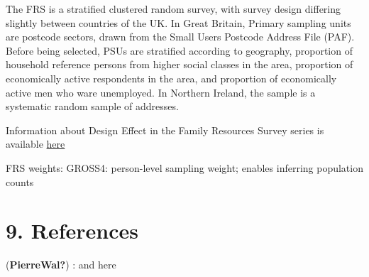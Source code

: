 \documentclass[
  14,
  a4paper,
  DIV=11,
  numbers=noendperiod]{scrartcl}
\begin{document}
The FRS is a stratified clustered random survey, with survey design
differing slightly between countries of the UK. In Great Britain,
Primary sampling units are postcode sectors, drawn from the Small Users
Postcode Address File (PAF). Before being selected, PSUs are stratified
according to geography, proportion of household reference persons from
higher social classes in the area, proportion of economically active
respondents in the area, and proportion of economically active men who
ware unemployed. In Northern Ireland, the sample is a systematic random
sample of addresses.

Information about Design Effect in the Family Resources Survey series is
available
\href{https://assets.publishing.service.gov.uk/government/uploads/system/uploads/attachment_data/file/972808/Ch1_Methodology_and_Standard_Errors.xlsx}{here}

FRS weights: GROSS4: person-level sampling weight; enables inferring
population counts

\hypertarget{references}{%
\section{9. References}\label{references}}

(\textbf{PierreWal?}) : and here
\end{document}
